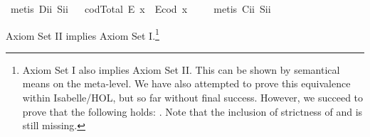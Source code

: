 \begin{isabellebody}
\isamarkupfalse%
\ {\isacharparenleft}metis\ D\isactrlsub i\isactrlsub i\ S\isactrlsub i\isactrlsub i{\isacharparenright}%
\endisatagproof
{\isafoldproof}%
%
\isadelimproof
\ \isanewline
%
\endisadelimproof
{}\isamarkupfalse%
\ codTotal{\isacharcolon}\ {\isachardoublequoteopen}E\ x\ \isactrlbold {\isasymrightarrow}\ E{\isacharparenleft}cod\ x{\isacharparenright}{\isachardoublequoteclose}\ \isanewline
%
\isadelimproof
\ \ %
\endisadelimproof
%
\isatagproof
{}\isamarkupfalse%
\ {\isacharparenleft}metis\ C\isactrlsub i\isactrlsub i\ S\isactrlsub i\isactrlsub i{\isacharparenright}%
\endisatagproof
{\isafoldproof}%
%
\isadelimproof
%
\endisadelimproof
%
\begin{isamarkuptext}%
Axiom Set II implies Axiom Set I.\footnote{Axiom Set I also implies Axiom Set II. This can 
be shown by semantical means on the meta-level. We have also attempted to prove this equivalence 
within Isabelle/HOL, but so far without final success. However, we succeed to 
prove that the following holds: . Note that the inclusion of strictness of  and  is still missing.}%

\end{isamarkuptext}
\end{isabellebody}
